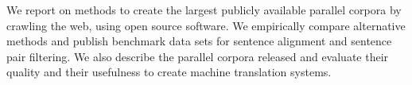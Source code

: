 We report on methods to create the largest publicly available  parallel corpora by crawling the web, using open source software. We empirically compare alternative methods and publish benchmark data sets for sentence alignment and sentence pair filtering. We also describe the parallel corpora released and evaluate their quality and their usefulness to create machine translation systems.
